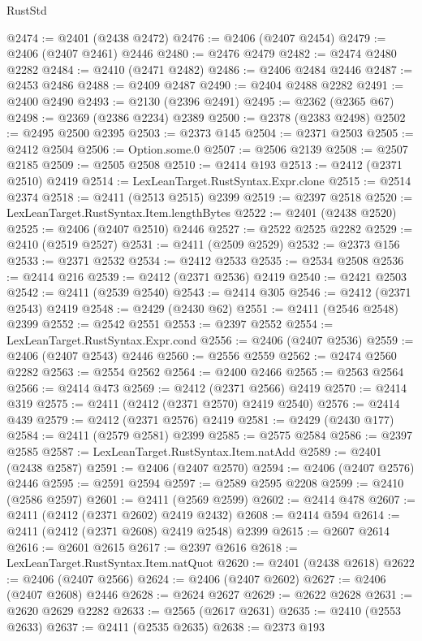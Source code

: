 \begin{lexlean}{RustStd}
\begin{coremodule}
@2474 := @2401 (@2438 @2472)
@2476 := @2406 (@2407 @2454)
@2479 := @2406 (@2407 @2461) @2446
@2480 := @2476 @2479
@2482 := @2474 @2480 @2282
@2484 := @2410 (@2471 @2482)
@2486 := @2406 @2484 @2446
@2487 := @2453 @2486
@2488 := @2409 @2487
@2490 := @2404 @2488 @2282
@2491 := @2400 @2490
@2493 := @2130 (@2396 @2491)
@2495 := @2362 (@2365 @67)
@2498 := @2369 (@2386 @2234) @2389
@2500 := @2378 (@2383 @2498)
@2502 := @2495 @2500 @2395
@2503 := @2373 @145
@2504 := @2371 @2503
@2505 := @2412 @2504
@2506 := Option.some.{0}
@2507 := @2506 @2139
@2508 := @2507 @2185
@2509 := @2505 @2508
@2510 := @2414 @193
@2513 := @2412 (@2371 @2510) @2419
@2514 := LexLeanTarget.RustSyntax.Expr.clone
@2515 := @2514 @2374
@2518 := @2411 (@2513 @2515) @2399
@2519 := @2397 @2518
@2520 := LexLeanTarget.RustSyntax.Item.lengthBytes
@2522 := @2401 (@2438 @2520)
@2525 := @2406 (@2407 @2510) @2446
@2527 := @2522 @2525 @2282
@2529 := @2410 (@2519 @2527)
@2531 := @2411 (@2509 @2529)
@2532 := @2373 @156
@2533 := @2371 @2532
@2534 := @2412 @2533
@2535 := @2534 @2508
@2536 := @2414 @216
@2539 := @2412 (@2371 @2536) @2419
@2540 := @2421 @2503
@2542 := @2411 (@2539 @2540)
@2543 := @2414 @305
@2546 := @2412 (@2371 @2543) @2419
@2548 := @2429 (@2430 @62)
@2551 := @2411 (@2546 @2548) @2399
@2552 := @2542 @2551
@2553 := @2397 @2552
@2554 := LexLeanTarget.RustSyntax.Expr.cond
@2556 := @2406 (@2407 @2536)
@2559 := @2406 (@2407 @2543) @2446
@2560 := @2556 @2559
@2562 := @2474 @2560 @2282
@2563 := @2554 @2562
@2564 := @2400 @2466
@2565 := @2563 @2564
@2566 := @2414 @473
@2569 := @2412 (@2371 @2566) @2419
@2570 := @2414 @319
@2575 := @2411 (@2412 (@2371 @2570) @2419 @2540)
@2576 := @2414 @439
@2579 := @2412 (@2371 @2576) @2419
@2581 := @2429 (@2430 @177)
@2584 := @2411 (@2579 @2581) @2399
@2585 := @2575 @2584
@2586 := @2397 @2585
@2587 := LexLeanTarget.RustSyntax.Item.natAdd
@2589 := @2401 (@2438 @2587)
@2591 := @2406 (@2407 @2570)
@2594 := @2406 (@2407 @2576) @2446
@2595 := @2591 @2594
@2597 := @2589 @2595 @2208
@2599 := @2410 (@2586 @2597)
@2601 := @2411 (@2569 @2599)
@2602 := @2414 @478
@2607 := @2411 (@2412 (@2371 @2602) @2419 @2432)
@2608 := @2414 @594
@2614 := @2411 (@2412 (@2371 @2608) @2419 @2548) @2399
@2615 := @2607 @2614
@2616 := @2601 @2615
@2617 := @2397 @2616
@2618 := LexLeanTarget.RustSyntax.Item.natQuot
@2620 := @2401 (@2438 @2618)
@2622 := @2406 (@2407 @2566)
@2624 := @2406 (@2407 @2602)
@2627 := @2406 (@2407 @2608) @2446
@2628 := @2624 @2627
@2629 := @2622 @2628
@2631 := @2620 @2629 @2282
@2633 := @2565 (@2617 @2631)
@2635 := @2410 (@2553 @2633)
@2637 := @2411 (@2535 @2635)
@2638 := @2373 @193

\end{coremodule}
\end{lexlean}
